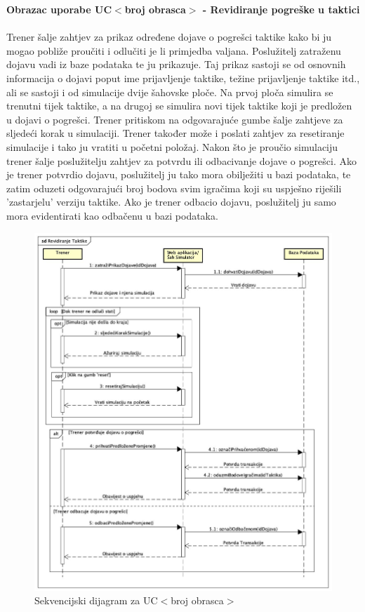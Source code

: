 				\eject
				
				\textbf{Obrazac uporabe UC$<$broj obrasca$>$ - Revidiranje pogreške u taktici}\\
				\\Trener šalje zahtjev za prikaz određene dojave o pogrešci taktike kako bi ju mogao pobliže proučiti i odlučiti je li primjedba valjana. Poslužitelj zatraženu dojavu vadi iz baze podataka te ju prikazuje. Taj prikaz sastoji se od osnovnih informacija o dojavi poput ime prijavljenje taktike, težine prijavljenje taktike itd., ali se sastoji i od simulacije dvije šahovske ploče. Na prvoj ploča simulira se trenutni tijek taktike, a na drugoj se simulira novi tijek taktike koji je predložen u dojavi o pogrešci. Trener pritiskom na odgovarajuće gumbe šalje zahtjeve za sljedeći korak u simulaciji. Trener također može i poslati zahtjev za resetiranje simulacije i tako ju vratiti u početni položaj. Nakon što je proučio simulaciju trener šalje poslužitelju zahtjev za potvrdu ili odbacivanje dojave o pogrešci. Ako je trener potvrdio dojavu, poslužitelj ju tako mora obilježiti u bazi podataka, te zatim oduzeti odgovarajući broj bodova svim igračima koji su uspješno riješili 'zastarjelu' verziju taktike. Ako je trener odbacio dojavu, poslužitelj ju samo mora evidentirati kao odbačenu u bazi podataka.
			

				
				\begin{figure}[H]
					\centerfloat
        					\includegraphics[scale=0.46]{dijagrami/RevidiranjeTaktike.jpg} %
        					\caption{Sekvencijski dijagram za UC$<$broj obrasca$>$}
        					\label{fig:UC$<$broj obrasca$>$}
				\end{figure}
				
